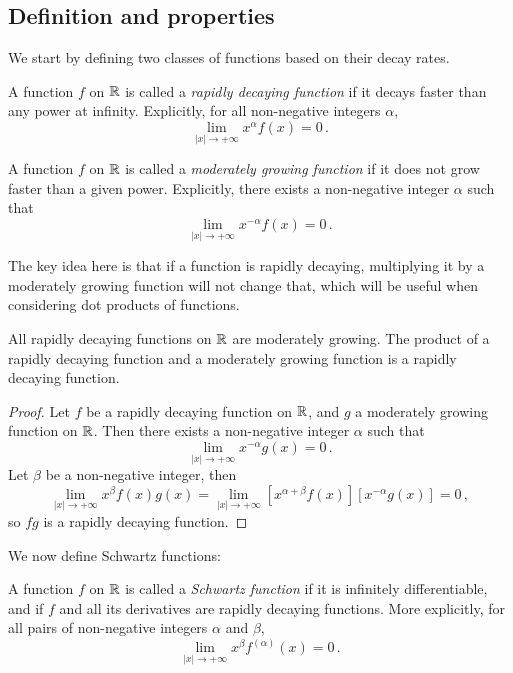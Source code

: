 \subsection{Definition and properties}
We start by defining two classes of functions based on their decay rates.
\begin{definition}
  A function $f$ on $\mathbb{R}$ is called a \emph{rapidly decaying function} if it decays faster
  than any power at infinity. Explicitly, for all non-negative integers $\alpha$,
  \begin{equation}
    \lim_{|x|\to+\infty}x^\alpha f(x)=0\,.
  \end{equation}
\end{definition}
\begin{definition}
  A function $f$ on $\mathbb{R}$ is called a \emph{moderately growing function} if it does not
  grow faster than a given power. Explicitly, there exists a non-negative integer $\alpha$
  such that
  \begin{equation}
    \lim_{|x|\to+\infty}x^{-\alpha}f(x)=0\,.
  \end{equation}
\end{definition}
The key idea here is that if a function is rapidly decaying, multiplying it by a
moderately growing function will not change that, which will be useful when considering
dot products of functions.
\begin{proposition}
  \label{prop:rapid-times-moderate}
  All rapidly decaying functions on $\mathbb{R}$ are moderately growing. The product of a rapidly
  decaying function and a moderately growing function is a rapidly decaying function.
\end{proposition}
\begin{proof}
  Let $f$ be a rapidly decaying function on $\mathbb{R}$, and $g$ a moderately growing function on
  $\mathbb{R}$. Then there exists a non-negative integer $\alpha$ such that
  \begin{equation}
    \lim_{|x|\to+\infty}x^{-\alpha}g(x)=0\,.
  \end{equation}
  Let $\beta$ be a non-negative integer, then
  \begin{equation}
    \lim_{|x|\to+\infty}x^\beta f(x)g(x)=
    \lim_{|x|\to+\infty}[x^{\alpha+\beta} f(x)][x^{-\alpha}g(x)]=0\,,
  \end{equation}
  so $fg$ is a rapidly decaying function.
\end{proof}
We now define Schwartz functions:
\begin{definition}
  \label{def:schwartz-fn}
  A function $f$ on $\mathbb{R}$ is called a \emph{Schwartz function} if it is infinitely
  differentiable, and if $f$ and all its derivatives are rapidly decaying functions. More
  explicitly, for all pairs of non-negative integers $\alpha$ and $\beta$,
  \begin{equation}
    \lim_{|x|\to+\infty}x^\beta f^{(\alpha)}(x)=0\,.
  \end{equation}
\end{definition}
